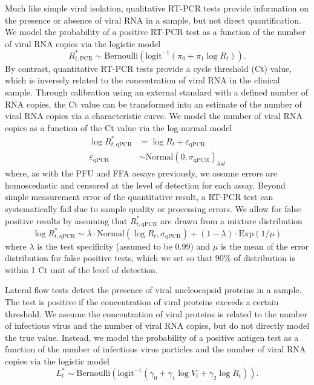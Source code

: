 \documentclass[11pt]{article}
\begin{document}
Much like simple viral isolation, qualitative RT-PCR tests provide information on the presence or absence of viral RNA in a sample, but not direct quantification. We model the probability of a positive RT-PCR test as a function of the number of viral RNA copies via the logistic model
\begin{equation*}
    R^{*}_{t,\text{PCR}} \sim \text{Bernoulli}(\text{logit}^{-1}(\pi_0 + \pi_1 \log R_t)).
\end{equation*}
By contrast, quantitative RT-PCR tests provide a cycle threshold (Ct) value, which is inversely related to the concentration of viral RNA in the clinical sample. Through calibration using an external standard with a defined number of RNA copies, the Ct value can be transformed into an estimate of the number of viral RNA copies via a characteristic curve. We model the number of viral RNA copies as a function of the Ct value via the log-normal model
\begin{align*}
    \log R^{*}_{t,\text{qPCR}} &= \log R_t + \varepsilon_{\text{qPCR}} \\
    \varepsilon_{\text{qPCR}} &\sim \text{Normal}(0, \sigma_{\text{qPCR}})_{lod}
\end{align*}
where, as with the PFU and FFA assays previously, we assume errors are homoscedastic and censored at the level of detection for each assay. Beyond simple measurement error of the quantitative result, a RT-PCR test can systematically fail due to sample quality or processing errors. We allow for false positive results by assuming that $R^{*}_{t,\text{qPCR}}$ are drawn from a mixture distribution
\begin{equation*}
    \log R^{*}_{t,\text{qPCR}} \sim \lambda \cdot \text{Normal}(\log R_t, \sigma_{\text{qPCR}}) + (1 - \lambda) \cdot \text{Exp}(1/\mu)
\end{equation*}
where $\lambda$ is the test specificity (assumed to be 0.99) and $\mu$ is the mean of the error distribution for false positive tests, which we set so that 90\% of distribution is within 1 Ct unit of the level of detection.

Lateral flow tests detect the presence of viral nucleocapsid proteins in a sample. The test is positive if the concentration of viral proteins exceeds a certain threshold. We assume the concentration of viral proteins is related to the number of infectious virus and the number of viral RNA copies, but do not directly model the true value. Instead, we model the probability of a positive antigen test as a function of the number of infectious virus particles and the number of viral RNA copies via the logistic model
\begin{equation*}
    L_t^* \sim \text{Bernoulli}(\text{logit}^{-1}(\gamma_0 + \gamma_1 \log V_t + \gamma_2 \log R_t)).
\end{equation*}
\end{document}
